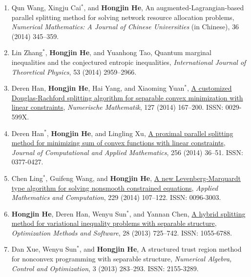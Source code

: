 \begin{enumerate}
\item Qun Wang, Xingju Cai$^*$, and {\bf\color{black}Hongjin He}, An augmented-Lagrangian-based parallel splitting method for solving network resource allocation problems, {\it Numerical Mathematics: A Journal of Chinese Universities} (in Chinese), {36} (2014) 345--359.

\item Lin Zhang$^*$, {\bf\color{black}Hongjin He}, and Yuanhong Tao, {Quantum marginal inequalities and the conjectured entropic inequalities}, {\it International Journal of Theoretical Physics}, {53} (2014) 2959--2966.

\item Deren Han, {\bf\color{black}Hongjin He}, Hai Yang, and Xiaoming Yuan$^*$, \href{http://link.springer.com/article/10.1007\%2Fs00211-013-0580-2#page-1}{\color{blue}A customized Douglas-Rachford splitting algorithm for separable convex minimization with linear constraints}, {\it Numerische Mathematik}, {127} (2014) 167--200. ISSN: 0029-599X.

\item Deren Han$^*$, {\bf\color{black}Hongjin He}, and Lingling Xu, \href{http://www.sciencedirect.com/science/article/pii/S0377042713003543}{A proximal parallel splitting method for minimizing sum of convex functions with linear constraints}, {\it Journal of Computational and Applied Mathematics}, {256} (2014) 36--51. ISSN: 0377-0427.

\item Chen Ling$^*$, Guifeng Wang, and {\bf\color{black}Hongjin He}, \href{http://www.sciencedirect.com/science/article/pii/S0096300313012915}{A new Levenberg-Marquardt type algorithm for solving nonsmooth constrained equations}, {\it Applied Mathematics and Computation}, {229} (2014) 107--122. ISSN: 0096-3003.

\item {\bf\color{black}Hongjin He}, Deren Han, Wenyu Sun$^*$, and Yannan Chen, \href{http://www.tandfonline.com/doi/abs/10.1080/10556788.2011.633609}{A hybrid splitting method for variational inequality problems with separable structure}, {\it Optimization Methods and Software}, 28 (2013) 725--742. ISSN: 1055-6788.

\item Dan Xue, Wenyu Sun$^*$, and {\bf\color{black}Hongjin He}, A structured trust region method for nonconvex programming with separable structure, {\it Numerical Algebra, Control and Optimization}, {3} (2013) 283--293. ISSN: 2155-3289.


\end{enumerate}
